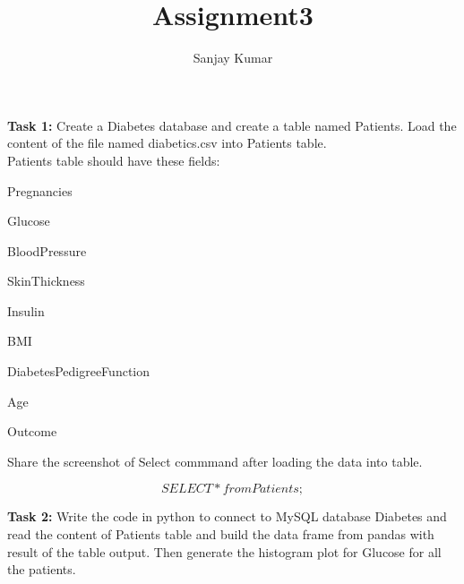\documentclass[12pt]{article}
\title{Assignment3}
\author{Sanjay Kumar}
\begin{document}
\maketitle
\textbf{Task 1:} Create a Diabetes database and create a table named Patients. Load the content
   of the file named diabetics.csv into Patients table.\\
   

   Patients table should have these fields:\\
   \enumerate
   \item {Pregnancies}
   \item {Glucose}
   \item {BloodPressure}
   \item {SkinThickness}
   \item {Insulin}
   \item {BMI}
   \item {DiabetesPedigreeFunction}
   \item {Age}
   \item {Outcome}
   \endenumerate


Share the screenshot of Select commmand after loading the data into table.
         
         \[ SELECT * from  Patients;\]

\textbf{Task 2:}
    Write the code in python to connect to MySQL database Diabetes and read the content
    of Patients table and build the data frame from pandas with result of the table output.
    Then generate the histogram plot for Glucose for all the patients.
\end{document}
